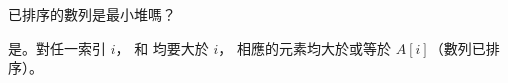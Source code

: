 \startEXERCISE
已排序的數列是最小堆嗎？
\stopEXERCISE

\startANSWER
是。對任一索引 $i$，  和  均要大於 $i$，
相應的元素均大於或等於 $A[i]$（數列已排序）。
\stopANSWER
